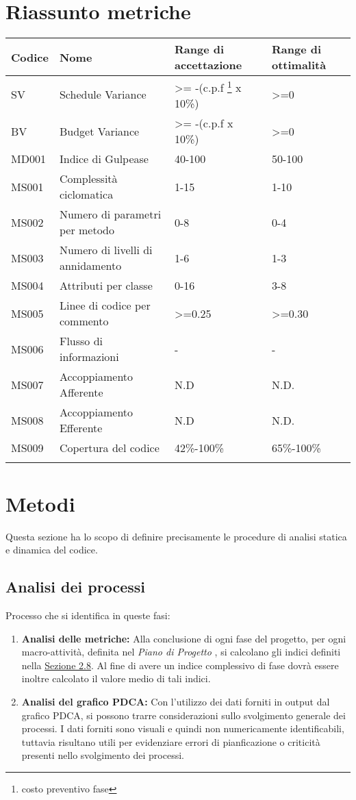 \section{Riassunto metriche}
\begin{center}
\begin{tabularx}{\textwidth}{|X|X|X|X|}

	\hline
	\textbf{Codice} & \textbf{Nome} & 	\textbf{Range di accettazione} & \textbf{Range di ottimalità}\\
	\endhead
	\hline
			SV & Schedule Variance& >= -(c.p.f \footnote{costo preventivo fase} x 10\%)& >=0  \\
	\hline
	BV & Budget Variance & >= -(c.p.f x 10\%)& >=0 \\
	\hline
	MD001 & Indice di Gulpease & 40-100 & 50-100\\
	\hline
	MS001 & Complessità ciclomatica & 1-15 & 1-10 \\
	\hline
	MS002 & Numero di parametri per metodo & 0-8 & 0-4 \\
	\hline
	MS003 & Numero di livelli di annidamento & 1-6 & 1-3 \\
	\hline
	MS004 & Attributi per classe & 0-16 & 3-8 \\
	\hline
	MS005 & Linee di codice per commento & >=0.25 & >=0.30 \\
	\hline
	MS006 & Flusso di informazioni & - & - \\
	\hline
	MS007 & Accoppiamento Afferente & N.D & N.D. \\
	\hline
	MS008 & Accoppiamento Efferente& N.D & N.D. \\
	\hline
	MS009 & Copertura del codice & 42\%-100\% & 65\%-100\% \\
	\hline
	\caption{Tabella delle metriche}
\end{tabularx}
\end{center}

\section{Metodi}
Questa sezione ha lo scopo di definire precisamente le procedure di analisi statica e dinamica del codice.
\subsection{Analisi dei processi}
Processo che si identifica in queste fasi:
\begin{enumerate}
	\item \textbf{Analisi delle metriche:} Alla conclusione di ogni fase del progetto, per ogni macro-attività, definita nel
	\textit{Piano di Progetto} , si calcolano gli indici definiti nella \hyperref[Metriche]{Sezione 2.8}. Al fine
	di avere un indice complessivo di fase dovrà essere inoltre calcolato il valore medio
	di tali indici.
	\item \textbf{Analisi del grafico PDCA:} Con l'utilizzo dei dati forniti in output dal grafico PDCA, si possono trarre considerazioni sullo svolgimento generale dei processi.
	I dati forniti sono visuali e quindi non numericamente identificabili, tuttavia risultano utili per evidenziare errori di pianficazione o criticità presenti nello svolgimento dei processi.
\end{enumerate}
